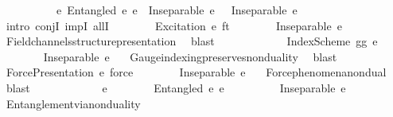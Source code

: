 \begin{isabellebody}
\ \ \ \ \ \ \ \ \ \ {\isacharparenleft}{\kern0pt}{\isasymforall}e{}{\isachardot}{\kern0pt}\ Entangled\ e\ e{}\ {\isasymlongrightarrow}\ Inseparable\ e\ {\isasymOmega}\ {\isasymand}\ Inseparable\ e{}\ {\isasymOmega}{\isacharparenright}{\kern0pt}{\isachardoublequoteclose}\isanewline
\ \ \ \ \isamarkupfalse%
\ {\isacharparenleft}{\kern0pt}intro\ conjI\ impI\ allI{\isacharparenright}{\kern0pt}\isanewline
\ \ \ \ \ \ \isamarkupfalse%
\ {\isachardoublequoteopen}Excitation\ e\ ft{\isachardoublequoteclose}\isanewline
\ \ \ \ \ \ \isamarkupfalse%
\ {\isachardoublequoteopen}Inseparable\ e\ {\isasymOmega}{\isachardoublequoteclose}\ \isamarkupfalse%
\ Field{\isacharunderscore}{\kern0pt}channels{\isacharunderscore}{\kern0pt}structure{\isacharunderscore}{\kern0pt}presentation\ \isamarkupfalse%
\ blast\isanewline
\ \ \ \ \isamarkupfalse%
\isanewline
\ \ \ \ \ \ \isamarkupfalse%
\ {\isachardoublequoteopen}IndexScheme\ gg\ e{\isachardoublequoteclose}\isanewline
\ \ \ \ \ \ \isamarkupfalse%
\ {\isachardoublequoteopen}Inseparable\ e\ {\isasymOmega}{\isachardoublequoteclose}\ \isamarkupfalse%
\ Gauge{\isacharunderscore}{\kern0pt}indexing{\isacharunderscore}{\kern0pt}preserves{\isacharunderscore}{\kern0pt}nonduality\ \isamarkupfalse%
\ blast\isanewline
\ \ \ \ \isamarkupfalse%
\isanewline
\ \ \ \ \ \ \isamarkupfalse%
\ {\isachardoublequoteopen}ForcePresentation\ e\ force{\isachardoublequoteclose}\isanewline
\ \ \ \ \ \ \isamarkupfalse%
\ {\isachardoublequoteopen}Inseparable\ e\ {\isasymOmega}{\isachardoublequoteclose}\ \isamarkupfalse%
\ Force{\isacharunderscore}{\kern0pt}phenomena{\isacharunderscore}{\kern0pt}nondual\ \isamarkupfalse%
\ blast\isanewline
\ \ \ \ \isamarkupfalse%
\isanewline
\ \ \ \ \ \ \isamarkupfalse%
\ e{}\isanewline
\ \ \ \ \ \ \isamarkupfalse%
\ {\isachardoublequoteopen}Entangled\ e\ e{}{\isachardoublequoteclose}\isanewline
\ \ \ \ \ \ \isamarkupfalse%
\ \isamarkupfalse%
\ {\isachardoublequoteopen}Inseparable\ e\ {\isasymOmega}{\isachardoublequoteclose}\ \isamarkupfalse%
\ Entanglement{\isacharunderscore}{\kern0pt}via{\isacharunderscore}{\kern0pt}nonduality\ \isamarkupfalse%

\end{isabellebody}
